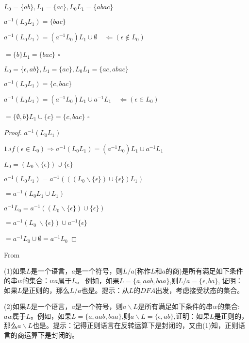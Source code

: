 \begin{example}
	$L_0 = \{ab\},L_1 = \{ac\}, L_0L_1 = \{abac\}$
	
	$a^{-1}(L_0L_1) = \{bac\}$
	
	$a^{-1}(L_0L_1) = (a^{-1}L_0)L_1 \cup \emptyset \quad \Leftarrow(\epsilon \notin L_0)$
	
	$= \{b\}L_1 = \{bac\}$ \hfill$\square$ 
\end{example}

\begin{example}
	$L_0 = \{\epsilon,ab\},L_1 = \{ac\}, L_0L_1 = \{ac,abac\}$
	
	$a^{-1}(L_0L_1) = \{c,bac\}$
	
	$a^{-1}(L_0L_1) = (a^{-1}L_0)L_1 \cup a^{-1}L_1 \quad\Leftarrow(\epsilon \in L_0)$
	
	$= \{\emptyset,b\}L_1 \cup \{c\} = \{c,bac\}$ \hfill$\square$ 
\end{example}

\begin{proof}
	$a^{-1}(L_0L_1)$
	
	$1. if(\epsilon \in L_0) \Rightarrow a^{-1}(L_0L_1) = (a^{-1}L_0)L_1 \cup a^{-1}L_1 $ 
	
	$L_0 = (L_0 \backslash \{\epsilon\}) \cup \{\epsilon\}$
	
	$a^{-1}(L_0L_1) = a^{-1}(((L_0 \backslash \{\epsilon\}) \cup \{\epsilon\})L_1)$
	
	$=a^{-1}(L_0L_1\cup L_1)$
	
	$a^{-1}L_0 = a^{-1}((L_0 \backslash \{\epsilon\}) \cup \{\epsilon\})$
	
	$=a^{-1}(L_0\ \backslash \{\epsilon \}) \cup a^{-1}\{\epsilon \}$
	
	$=a^{-1}L_0 \cup \emptyset = a^{-1}L_0$
\end{proof}
	

\clearpage

From \cite[p99]{Hopcroft2008}

(1)如果$L$是一个语言，$a$是一个符号，则$L/a$(称作$L$和$a$的商)是所有满足如下条件的串$w$的集合：$wa$属于$L$。
例如，如果$L=\{a,aab,baa\}$,则$L/a = \{\epsilon,ba\}$, 证明：如果$L$是正则的，那么$L/a$也是。提示：从$L$的$DFA$出发，考虑接受状态的集合。

(2)如果$L$是一个语言，$a$是一个符号，则$a\backslash L$是所有满足如下条件的串$w$的集合: $aw$属于$L$。例如，如果$L=\{a,aab,baa\}$,则$a\backslash L=\{\epsilon,ab\}$,证明：如果$L$是正则的，那么$a\backslash L$也是。提示：记得正则语言在反转运算下是封闭的，又由(1)知，正则语言的商运算下是封闭的。

